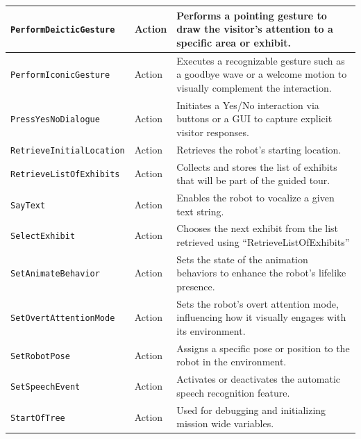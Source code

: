 \documentclass{CSSRforAfrica}
\begin{document}
\begin{longtable}[c]{|p{4.65cm}|p{1.4cm}|p{7.4cm}|}
  \small{\texttt{PerformDeicticGesture}} & \small{Action} & \small{Performs a pointing gesture to draw the visitor’s attention to a specific area or exhibit.} \\ \hline
  \small{\texttt{PerformIconicGesture}} & \small{Action} & \small{Executes a recognizable gesture such as a goodbye wave or a welcome motion to visually complement the interaction.} \\ \hline
  \small{\texttt{PressYesNoDialogue}} & \small{Action} & \small{Initiates a Yes/No interaction via buttons or a GUI to capture explicit visitor responses.} \\ \hline
  \small{\texttt{RetrieveInitialLocation}} & \small{Action} & \small{Retrieves the robot's starting location.} \\ \hline
  \small{\texttt{RetrieveListOfExhibits}} & \small{Action} & \small{Collects and stores the list of exhibits that will be part of the guided tour.} \\ \hline
  \small{\texttt{SayText}} & \small{Action} & \small{Enables the robot to vocalize a given text string.} \\ \hline
  \small{\texttt{SelectExhibit}} & \small{Action} & \small{Chooses the next exhibit from the list retrieved using ``RetrieveListOfExhibits''} \\ \hline
  \small{\texttt{SetAnimateBehavior}} & \small{Action} & \small{Sets the state of the animation behaviors to enhance the robot’s lifelike presence.} \\ \hline
  \small{\texttt{SetOvertAttentionMode}} & \small{Action} & \small{Sets the robot’s overt attention mode, influencing how it visually engages with its environment.} \\ \hline
  \small{\texttt{SetRobotPose}} & \small{Action} & \small{Assigns a specific pose or position to the robot in the environment.} \\ \hline
  \small{\texttt{SetSpeechEvent}} & \small{Action} & \small{Activates or deactivates the automatic speech recognition feature.} \\ \hline
  \small{\texttt{StartOfTree}} & \small{Action} & \small{Used for debugging and initializing mission wide variables.} \\ \hline

\end{longtable}





               
\end{document}
